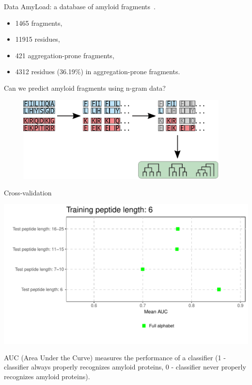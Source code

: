 \documentclass{beamer}\usepackage[]{graphicx}\usepackage[]{color}
\makeatletter
\def\maxwidth{ %
  \ifdim\Gin@nat@width>\linewidth
    \linewidth
  \else
    \Gin@nat@width
  \fi
}
\newenvironment{knitrout}{}{} %
\makeatother
\begin{document}
\begin{frame}{Data}
AmyLoad: a database of amyloid fragments~\citep{WozniakAmyLoadwebsitededicated2015}.

\begin{itemize}
 \item 1465 fragments,
 \item 11915 residues,
 \item 421 aggregation-prone fragments,
 \item 4312 residues (36.19\%) in aggregation-prone fragments.
\end{itemize}

\end{frame}


\begin{frame}
Can we predict amyloid fragments using n-gram data?
\end{frame}


    \begin{frame}
\begin{figure} 
\includegraphics[width=0.95\textwidth]{static_figure/ngram1.eps}
\end{figure}
  \end{frame}

\begin{frame}{Cross-validation}
\begin{knitrout}
\color{fgcolor}

{\centering \includegraphics[width=\maxwidth]{figure/unnamed-chunk-9-1} 

}



\end{knitrout}
AUC (Area Under the Curve) measures the performance of a classifier (1 - classifier always properly recognizes amyloid proteins, 0 - classifier never properly recognizes amyloid proteins).

\end{frame}
\end{document}
